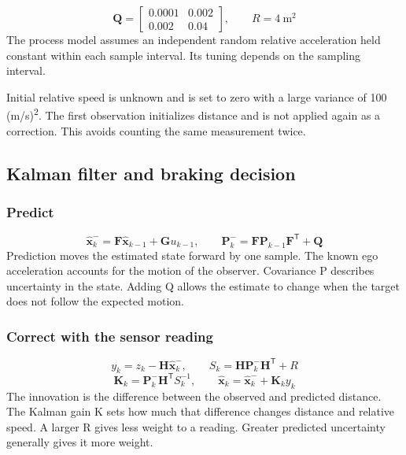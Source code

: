 \documentclass[11pt,a4paper]{article}
\begin{document}
\begin{equation}\mathbf{Q}=\begin{bmatrix}0.0001&0.002\\0.002&0.04\end{bmatrix},\qquad R=4\ \mathrm{m^2}\end{equation}
The process model assumes an independent random relative acceleration held constant within each sample interval. Its tuning depends on the sampling interval.\par

Initial relative speed is unknown and is set to zero with a large variance of 100 (m/s)\textsuperscript{2}. The first observation initializes distance and is not applied again as a correction. This avoids counting the same measurement twice.\par

\clearpage
{}\subsection{Kalman filter and braking decision}
\subsubsection{Predict}
\begin{equation}\widehat{\mathbf{x}}_k^- =\mathbf{F}\widehat{\mathbf{x}}_{k-1}+\mathbf{G}u_{k-1},\qquad\mathbf{P}_k^-=\mathbf{F}\mathbf{P}_{k-1}\mathbf{F}^{\mathsf T}+\mathbf{Q}\end{equation}
Prediction moves the estimated state forward by one sample. The known ego acceleration accounts for the motion of the observer. Covariance P describes uncertainty in the state. Adding Q allows the estimate to change when the target does not follow the expected motion.\par

\subsubsection{Correct with the sensor reading}
\begin{equation}y_k=z_k-\mathbf{H}\widehat{\mathbf{x}}_k^-,\qquad S_k=\mathbf{H}\mathbf{P}_k^-\mathbf{H}^{\mathsf T}+R\end{equation}
\begin{equation}\mathbf{K}_k=\mathbf{P}_k^-\mathbf{H}^{\mathsf T}S_k^{-1},\qquad\widehat{\mathbf{x}}_k=\widehat{\mathbf{x}}_k^-+\mathbf{K}_k y_k\end{equation}
The innovation is the difference between the observed and predicted distance. The Kalman gain K sets how much that difference changes distance and relative speed. A larger R gives less weight to a reading. Greater predicted uncertainty generally gives it more weight.\par
\end{document}
